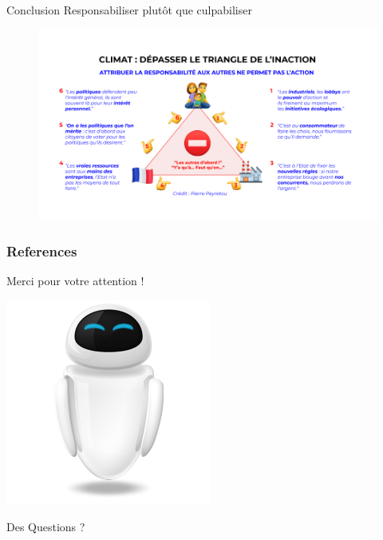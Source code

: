 \documentclass[10pt,xcolor={dvipsnames}]{beamer}
\begin{document}
\begin{frame}{Conclusion}{ Responsabiliser plutôt que culpabiliser}

\begin{figure}
    \centering
    \includegraphics[scale=0.35]{Feathergraphics/[Outils Méthodo] Triangle de l'inaction.png}
\end{figure}

\end{frame}


\begin{frame}[allowframebreaks]
        \frametitle{References}
        
        
\end{frame}

\begin{frame}{Merci pour votre attention !}
    		\begin{center}
	\includegraphics[scale=0.4]{EVE-icon.png}
	
	Des Questions ?
	\end{center}

\end{frame}
\end{document}
